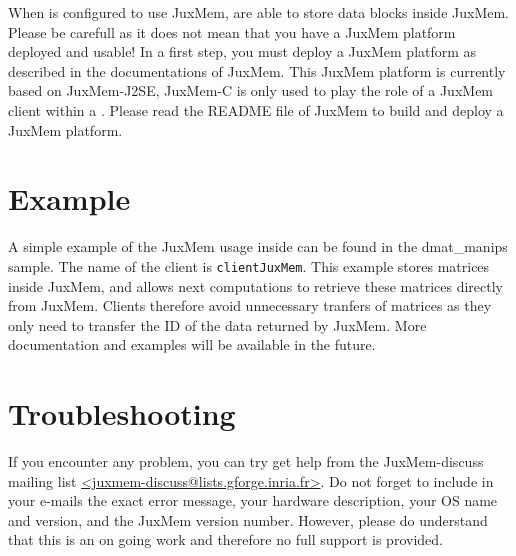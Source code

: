 When \diet is configured to use JuxMem, \sed are able to store data
blocks inside JuxMem. Please be carefull as it does not mean that you
have a JuxMem platform deployed and usable!  In a first step, you must
deploy a JuxMem platform as described in the documentations of
JuxMem. This JuxMem platform is currently based on JuxMem-J2SE,
JuxMem-C is only used to play the role of a JuxMem client within a
\diet \sed. Please read the README file of JuxMem to build and deploy
a JuxMem platform.

\section{Example}

A simple example of the JuxMem usage inside \diet can be found in the
dmat\_manips sample. The name of the client is
\texttt{clientJuxMem}. This example stores \diet matrices inside JuxMem, 
and allows next computations to retrieve these matrices directly from
JuxMem. Clients therefore avoid unnecessary tranfers of matrices as
they only need to transfer the ID of the data returned by JuxMem. More
documentation and examples will be available in the future.

\section{Troubleshooting}

If you encounter any problem, you can try get help from the
JuxMem-discuss mailing list
\url{<juxmem-discuss@lists.gforge.inria.fr>}. Do not forget to include
in your e-mails the exact error message, your hardware description,
your OS name and version, and the JuxMem version number.  However,
please do understand that this is an on going work and therefore no
full support is provided.

